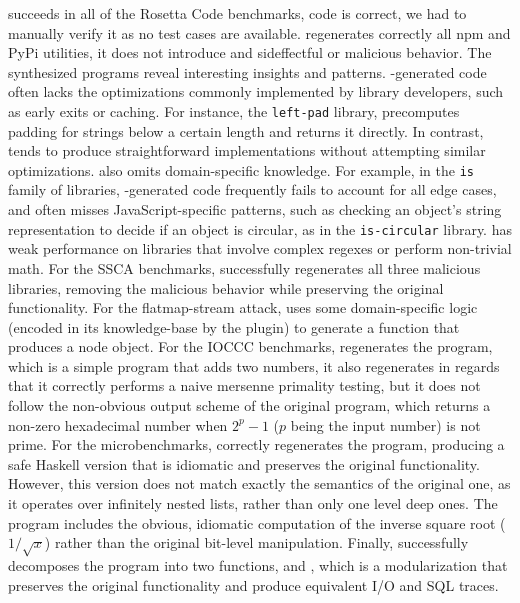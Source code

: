 \documentclass[a4paper,twoside,12pt]{report} %
\begin{document}
\sys succeeds in all of the Rosetta Code benchmarks, code is correct, we had to manually verify it as no test cases are available.
\sys regenerates correctly all npm and PyPi utilities, it does not introduce and sideffectful or malicious behavior.
The synthesized programs reveal interesting insights and patterns.
\sys-generated code often lacks the optimizations commonly
implemented by library developers, such as early exits or caching.
For instance, the \texttt{left-pad} library, precomputes padding for strings below a certain length
and returns it directly. In contrast, \sys tends to produce straightforward
implementations without attempting similar optimizations.
\sys also omits domain-specific knowledge.
For example, in the \texttt{is} family of libraries,
\sys-generated code frequently fails to account for all edge cases,
and often misses JavaScript-specific patterns,
such as checking an object’s string representation to decide if an object is circular, as in the \texttt{is-circular} library.
\sys has weak performance on libraries that involve complex regexes or perform non-trivial math.
For the SSCA benchmarks, \sys successfully regenerates all three malicious libraries, removing the malicious behavior while preserving the original functionality.
For the flatmap-stream attack, \sys uses some domain-specific logic (encoded in its knowledge-base by the  plugin) to generate a function that produces a node  object.
For the IOCCC benchmarks, \sys regenerates the  program, which is a simple program that adds two numbers,
it also regenerates  in regards that it correctly performs a naive mersenne primality testing, but it does not follow the non-obvious output scheme of the original program, which returns a non-zero hexadecimal number when $2^p - 1$ ($p$ being the input number) is not prime.
For the microbenchmarks, \sys correctly regenerates the  program, producing a safe Haskell version that is idiomatic and preserves the original functionality.
However, this version does not match exactly the semantics of the original one, as it operates over infinitely nested lists, rather than only one level deep ones.
The  program includes the obvious, idiomatic computation of the inverse square root ($1/\sqrt{x}$) rather than the original bit-level manipulation.
Finally, \sys successfully decomposes the  program into two
functions,  and , which is a
modularization that preserves the original functionality and produce equivalent I/O and SQL traces.
\end{document}
